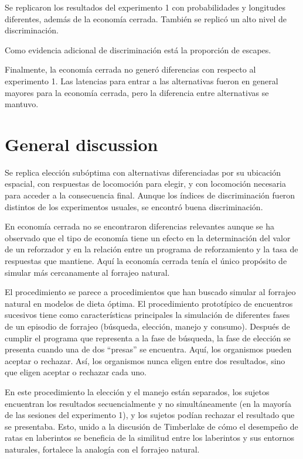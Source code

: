 \documentclass[a4paper,12pt]{article}
\begin{document}
Se replicaron los resultados del experimento 1 con probabilidades y longitudes diferentes, además de la economía cerrada.
También se replicó un alto nivel de discriminación.

Como evidencia adicional de discriminación está la proporción de escapes.

Finalmente, la economía cerrada no generó diferencias con respecto al experimento 1.
Las latencias para entrar a las alternativas fueron en general mayores para la economía cerrada, pero la diferencia entre alternativas se mantuvo.

\section{General discussion}

Se replica elección subóptima con alternativas diferenciadas por su ubicación espacial, con respuestas de locomoción para elegir, y con locomoción necesaria para acceder a la consecuencia final.
Aunque los índices de discriminación fueron distintos de los experimentos usuales, se encontró buena discriminación.

En economía cerrada no se encontraron diferencias relevantes aunque se ha observado que el tipo de economía tiene un efecto en la determinación del valor de un reforzador y en la relación entre un programa de reforzamiento y la tasa de respuestas que mantiene.
Aquí la economía cerrada tenía el único propósito de simular más cercanamente al forrajeo natural.

El procedimiento se parece a procedimientos que han buscado simular al forrajeo natural en modelos de dieta óptima.
El procedimiento prototípico de encuentros sucesivos tiene como características principales la simulación de diferentes fases de un episodio de forrajeo (búsqueda, elección, manejo y consumo).
Después de cumplir el programa que representa a la fase de búsqueda, la fase de elección se presenta cuando una de dos ``presas'' se encuentra.
Aquí, los organismos pueden aceptar o rechazar.
Así, los organismos nunca eligen entre dos resultados, sino que eligen aceptar o rechazar cada uno.

En este procedimiento la elección y el manejo están separados, los sujetos encuentran los resultados secuencialmente y no simultáneamente (en la mayoría de las sesiones del experimento 1), y los sujetos podían rechazar el resultado que se presentaba.
Esto, unido a la discusión de Timberlake de cómo el desempeño de ratas en laberintos se beneficia de la similitud entre los laberintos y sus entornos naturales, fortalece la analogía con el forrajeo natural.
\end{document}
